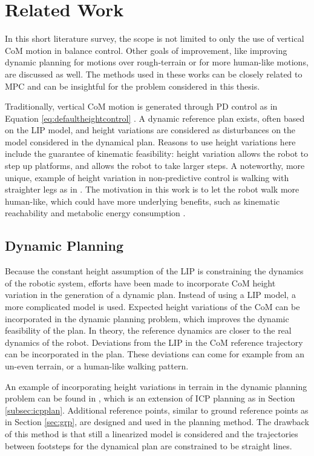 \section{Related Work}\label{sec:relatedworksheight}
In this short literature survey, the scope is not limited to only the use of vertical \ac{CoM} motion in balance control. Other goals of improvement, like improving dynamic planning for motions over rough-terrain or for more human-like motions, are discussed as well. The methods used in these works can be closely related to \ac{MPC} and can be insightful for the problem considered in this thesis.

Traditionally, vertical \ac{CoM} motion is generated through PD control as in Equation \eqref{eq:defaultheightcontrol} \cite{kajita2003resolved, koolen2016design}. A dynamic reference plan exists, often based on the LIP model, and height variations are considered as disturbances on the model considered in the dynamical plan. Reasons to use height variations here include the guarantee of kinematic feasibility: height variation allows the robot to step up platforms, and allows the robot to take larger steps. A noteworthy, more unique, example of height variation in non-predictive control is walking with straighter legs as in \cite{griffin2018straight}. The motivation in this work is to let the robot walk more human-like, which could have more underlying benefits, such as kinematic reachability and metabolic energy consumption \cite{wang2012optimizing}.

\subsection{Dynamic Planning}
Because the constant height assumption of the \ac{LIP} is constraining the dynamics of the robotic system, efforts have been made to incorporate CoM height variation in the generation of a dynamic plan. Instead of using a LIP model, a more complicated model is used. Expected height variations of the CoM can be incorporated in the dynamic planning problem, which improves the dynamic feasibility of the plan. In theory, the reference dynamics are closer to the real dynamics of the robot. Deviations from the \ac{LIP} in the \ac{CoM} reference trajectory can be incorporated in the plan. These deviations can come for example from an un-even terrain, or a human-like walking pattern.

An example of incorporating height variations in terrain in the dynamic planning problem can be found in \cite{englsberger2013three}, which is an extension of \ac{ICP} planning as in Section \ref{subsec:icpplan}. Additional reference points, similar to ground reference points as in Section \ref{sec:grp}, are designed and used in the planning method. The drawback of this method is that still a linearized model is considered and the trajectories between footsteps for the dynamical plan are constrained to be straight lines. 


